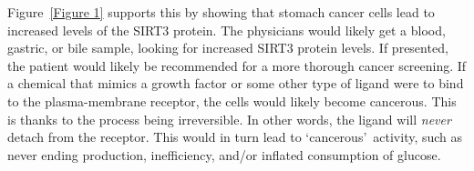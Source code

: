 \documentclass[11pt]{article}
\begin{document}
\begin{enumerate}
\begin{enumerate}
            Figure~\ref{Figure 1} supports this by showing that stomach cancer cells lead to increased levels of the SIRT3 protein.
            The physicians would likely get a blood, gastric, or bile sample, looking for increased SIRT3 protein levels.
            If presented, the patient would likely be recommended for a more thorough cancer screening.
            If a chemical that mimics a growth factor or some other type of ligand were to bind to the plasma-membrane receptor, the cells would likely become cancerous.
            This is thanks to the process being irreversible.
            In other words, the ligand will \textit{never} detach from the receptor.
            This would in turn lead to \lq{cancerous}\rq\ activity, such as never ending production, inefficiency, and/or inflated consumption of glucose.
        \end{enumerate}
    \end{enumerate}
\end{document}
